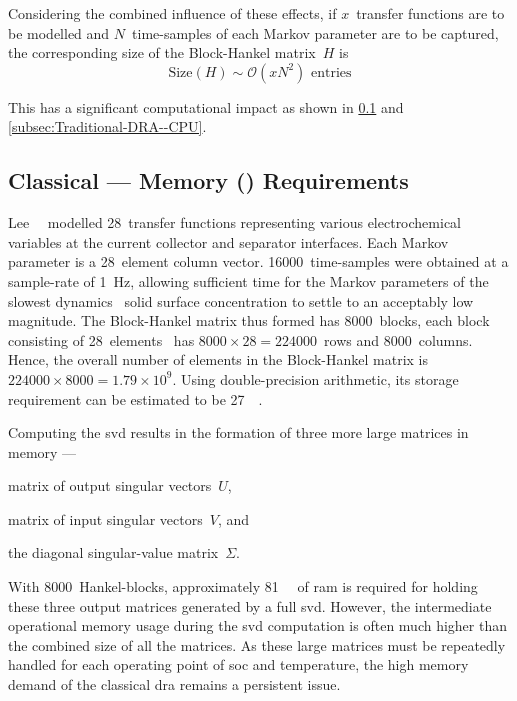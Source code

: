 Considering the combined  influence of these effects,  if $x$~transfer functions
are  to be  modelled and  $N$~time-samples of  each Markov  parameter are  to be
captured, the corresponding size of the Block-Hankel matrix~$H$ is
\begin{equation}
    \text{Size}(H)\sim \mathcal{O}(x N^2)\text{ entries}
\end{equation}

This    has    a    significant     computational    impact    as    shown    in
\cref{subsec:Traditional-DRA--Memory} and \cref{subsec:Traditional-DRA--CPU}.

\subsection{Classical  --- Memory () Requirements}\label{subsec:Traditional-DRA--Memory}

Lee~\etal~\cite{Lee2012a}  modelled 28~transfer  functions representing  various
electrochemical  variables at  the current  collector and  separator interfaces.
Each Markov  parameter is  a 28~element  column vector.  16000~time-samples were
obtained at  a sample-rate of  \SI{1}{\hertz}, allowing sufficient time  for the
Markov parameters  of the  slowest dynamics  \ie~solid surface  concentration to
settle  to an  acceptably low  magnitude.  The Block-Hankel  matrix thus  formed
has  8000~blocks, each  block  consisting of  28~elements  \ie~has $8000  \times
28=224000$~rows  and 8000~columns.  Hence,  the overall  number  of elements  in
the  Block-Hankel matrix  is~${224000  \times 8000=1.79  \times 10^{9}}$.  Using
double-precision  arithmetic, its  storage requirement  can be  estimated to  be
\approx \SI{27}{\giga\byte}.

Computing the \gls{svd} results in the formation of three more large matrices in
memory ---
\begin{enumerate*}[label=\roman*)]
    \item matrix   of   output  singular   vectors~$U$,
    \item matrix of  input  singular vectors~$V$, and
    \item the diagonal singular-value  matrix~$\Sigma$.
\end{enumerate*}
With  8000~Hankel-blocks,  approximately  \SI{81}{\giga\byte}  of  \gls{ram}  is
required for holding these three output  matrices generated by a full \gls{svd}.
However,  the  intermediate  operational   memory  usage  during  the  \gls{svd}
computation is often much higher than the  combined size of all the matrices. As
these large  matrices must  be repeatedly  handled for  each operating  point of
\gls{soc} and  temperature, the  high memory demand  of the  classical \gls{dra}
remains a persistent issue.

